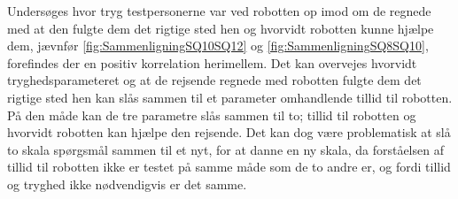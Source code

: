 Undersøges hvor tryg testpersonerne var ved robotten op imod om de regnede med at den fulgte dem det rigtige sted hen og hvorvidt robotten kunne hjælpe dem, jævnfør \autoref{fig:SammenligningSQ10SQ12} og \autoref{fig:SammenligningSQ8SQ10}, forefindes der en positiv korrelation herimellem. Det kan overvejes hvorvidt tryghedsparameteret og at de rejsende regnede med robotten fulgte dem det rigtige sted hen kan slås sammen til et parameter omhandlende tillid til robotten. På den måde kan de tre parametre slås sammen til to; tillid til robotten og hvorvidt robotten kan hjælpe den rejsende. Det kan dog være problematisk at slå to skala spørgsmål sammen til et nyt, for at danne en ny skala, da forståelsen af tillid til robotten ikke er testet på samme måde som de to andre er, og fordi tillid og tryghed ikke nødvendigvis er det samme. 

